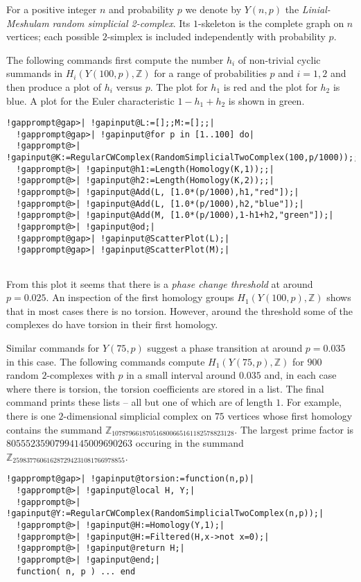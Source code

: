 \documentclass[a4paper,11pt]{report}
\begin{document}
{{For a positive integer $n$ and probability $p$ we denote by $Y(n,p)$ the \emph{Linial-Meshulam random simplicial 2-complex}. Its $1$-skeleton is the complete graph on $n$ vertices; each possible $2$-simplex is included independently with probability $p$. 

The following commands first compute the number $h_i$ of non-trivial cyclic summands in $H_i(Y(100,p), \mathbb Z)$ for a range of probabilities $p$ and $i=1,2$ and then produce a plot of $h_i$ versus $p$. The plot for $h_1$ is red and the plot for $h_2$ is blue. A plot for the Euler characteristic $1-h_1+h_2$ is shown in green. 
\begin{Verbatim}[commandchars=!@|,fontsize=\small,frame=single,label=Example]
  !gapprompt@gap>| !gapinput@L:=[];;M:=[];;|
  !gapprompt@gap>| !gapinput@for p in [1..100] do|
  !gapprompt@>| !gapinput@K:=RegularCWComplex(RandomSimplicialTwoComplex(100,p/1000));;|
  !gapprompt@>| !gapinput@h1:=Length(Homology(K,1));;|
  !gapprompt@>| !gapinput@h2:=Length(Homology(K,2));;|
  !gapprompt@>| !gapinput@Add(L, [1.0*(p/1000),h1,"red"]);|
  !gapprompt@>| !gapinput@Add(L, [1.0*(p/1000),h2,"blue"]);|
  !gapprompt@>| !gapinput@Add(M, [1.0*(p/1000),1-h1+h2,"green"]);|
  !gapprompt@>| !gapinput@od;|
  !gapprompt@gap>| !gapinput@ScatterPlot(L);|
  !gapprompt@gap>| !gapinput@ScatterPlot(M);|
  
\end{Verbatim}
 

   

From this plot it seems that there is a \emph{phase change threshold} at around $p=0.025$. An inspection of the first homology groups $H_1(Y(100,p), \mathbb Z)$ shows that in most cases there is no torsion. However, around the threshold
some of the complexes do have torsion in their first homology. 

Similar commands for $Y(75,p)$ suggest a phase transition at around $p=0.035$ in this case. The following commands compute $H_1(Y(75,p), \mathbb Z)$ for $900$ random $2$-complexes with $p$ in a small interval around $ 0.035$ and, in each case where there is torsion, the torsion coefficients are stored
in a list. The final command prints these lists -- all but one of which are of
length $1$. For example, there is one $2$-dimensional simplicial complex on $75$ vertices whose first homology contains the summand $\mathbb Z_{107879661870516800665161182578823128}$. The largest prime factor is $80555235907994145009690263$ occuring in the summand $\mathbb Z_{259837760616287294231081766978855}$. 
\begin{Verbatim}[commandchars=!@|,fontsize=\small,frame=single,label=Example]
  !gapprompt@gap>| !gapinput@torsion:=function(n,p)|
  !gapprompt@>| !gapinput@local H, Y;|
  !gapprompt@>| !gapinput@Y:=RegularCWComplex(RandomSimplicialTwoComplex(n,p));|
  !gapprompt@>| !gapinput@H:=Homology(Y,1);|
  !gapprompt@>| !gapinput@H:=Filtered(H,x->not x=0);|
  !gapprompt@>| !gapinput@return H;|
  !gapprompt@>| !gapinput@end;|
  function( n, p ) ... end
  

\end{Verbatim}}}
\end{document}
